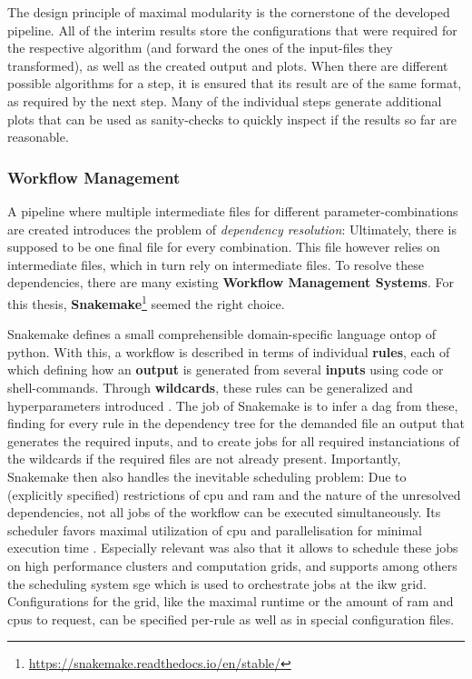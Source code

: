 The design principle of maximal modularity is the cornerstone of the developed pipeline. All of the interim results store the configurations that were required for the respective algorithm (and forward the ones of the input-files they transformed), as well as the created output and plots. When there are different possible algorithms for a step, it is ensured that its result are of the same format, as required by the next step. Many of the individual steps generate additional plots that can be used as sanity-checks to quickly inspect if the results so far are reasonable.

\subsubsection{Workflow Management}

A pipeline where multiple intermediate files for different parameter-combinations are created introduces the problem of \emph{dependency resolution}: Ultimately, there is supposed to be one final file for every combination. This file however relies on intermediate files, which in turn rely on intermediate files. To resolve these dependencies, there are many existing \textbf{Workflow Management Systems}. For this thesis, \textbf{Snakemake}\footnote{\url{https://snakemake.readthedocs.io/en/stable/}} \cite{Molder2021a} seemed the right choice.

Snakemake defines a small comprehensible domain-specific language ontop of python. With this, a workflow is described in terms of individual \textbf{rules}, each of which defining how an \textbf{output} is generated from several \textbf{inputs} using code or shell-commands. Through \textbf{wildcards}, these rules can be generalized and hyperparameters introduced \cite{Molder2021a}. The job of Snakemake is to infer a \gls{dag} from these, finding for every rule in the dependency tree for the demanded file an output that generates the required inputs, and to create jobs for all required instanciations of the wildcards if the required files are not already present. Importantly, Snakemake then also handles the inevitable scheduling problem: Due to (explicitly specified) restrictions of \acrshort{cpu} and \acrshort{ram} and the nature of the unresolved dependencies, not all jobs of the workflow can be executed simultaneously. Its scheduler favors maximal utilization of \acrshort{cpu} and parallelisation for minimal execution time \cite{Molder2021a}. Especially relevant was also that it allows to schedule these jobs on high performance clusters and computation grids, and supports among others the scheduling system \gls{sge} which is used to orchestrate jobs at the \gls{ikw} grid. Configurations for the grid, like the maximal runtime or the amount of \gls{ram} and \glspl{cpu} to request, can be specified per-rule as well as in special configuration files.


